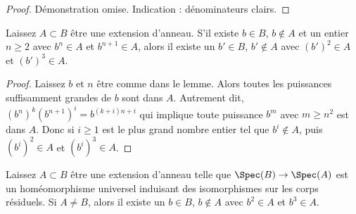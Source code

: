\begin{proof}
Démonstration omise. Indication : dénominateurs clairs.
\end{proof}

\begin{lemma}

\label{lemma-nth-and-nplusone-implies-square-and-cube}
Laissez $A \subset B$ être une extension d'anneau. S'il existe $b \in B$, $b \not \in A$ et un entier $n \geq 2$ avec $b^n \in A$ et $b^{n + 1} \in A$, alors il existe un $b' \in B$, $b' \not \in A$ avec $(b')^2 \in A$ et $(b')^3 \in A$.
\end{lemma}

\begin{proof}
Laissez $b$ et $n$ être comme dans le lemme. Alors toutes les puissances suffisamment grandes de $b$ sont dans $A$. Autrement dit, $(b^n)^k(b^{n + 1})^i = b^{(k + i)n + i}$ qui implique toute puissance $b^m$ avec $m \geq n^2$ est dans $A$. Donc si $i \geq 1$ est le plus grand nombre entier tel que $b^i \not \in A$, puis $(b^i)^2 \in A$ et $(b^i)^3 \in A$.
\end{proof}

\begin{lemma}

\label{lemma-square-and-cube}
Laissez $A \subset B$ être une extension d'anneau telle que $\Spec(B) \to \Spec(A)$ est un homéomorphisme universel induisant des isomorphismes sur les corps résiduels. Si $A \not = B$, alors il existe un $b \in B$, $b \not \in A$ avec $b^2 \in A$ et $b^3 \in A$.
\end{lemma}

